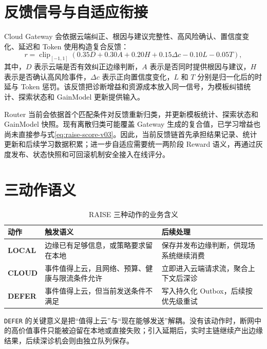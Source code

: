\section{反馈信号与自适应衔接}
Cloud Gateway 会依据云端纠正、根因与建议完整性、高风险确认、置信度变化、延迟和 Token 使用构造复合反馈：
\begin{equation}
  r=\operatorname{clip}_{[-1,1]}\!\left(
  0.35D+0.30A+0.20H+0.15\Delta c-0.10L-0.05T
  \right),
  \label{eq:cloud-reward-v03}
\end{equation}
其中，$D$ 表示云端是否有效纠正边缘判断，$A$ 表示是否同时提供根因与建议，$H$ 表示是否确认高风险事件，$\Delta c$ 表示正向置信度变化，$L$ 和 $T$ 分别是归一化后的时延与 Token 惩罚。该反馈把诊断增益和资源成本放入同一信号，为模板纠错统计、探索状态和 GainModel 更新提供输入。

Router 当前会依据首个匹配条件对反馈重新归类，并更新模板统计、探索状态和 GainModel 快照。现有离散归类可能覆盖 Gateway 生成的复合值，已学习增益也尚未直接参与式\eqref{eq:raise-score-v03}。因此，当前反馈链首先承担结果记录、统计更新和后续学习数据积累；进一步自适应需要统一两阶段 Reward 语义，再通过灰度发布、状态快照和可回滚机制安全接入在线评分。

\section{三动作语义}
\begin{table}[htbp]
  \centering
  \small
  \caption{RAISE 三种动作的业务含义}
  \label{tab:raise-actions}
  \begin{tabularx}{\textwidth}{>{\ttfamily\bfseries}p{} X X}
    \toprule
    \normalfont\bfseries 动作 & \textbf{触发语义} & \textbf{后续处理} \\
    \midrule
    LOCAL & 边缘已有足够信息，或策略要求留在本地 & 保存并发布边缘判断，供现场系统继续消费 \\
    CLOUD & 事件值得上云，且网络、预算、健康与限流条件允许 & 立即进入云端请求流，聚合上下文后深诊 \\
    DEFER & 事件值得上云，但当前发送条件不满足 & 写入持久化 Outbox，后续按优先级重试 \\
    \bottomrule
  \end{tabularx}
\end{table}

\texttt{DEFER} 的关键意义是把“值得上云”与“现在能够发送”解耦。没有该动作时，断网中的高价值事件只能被迫留在本地或直接失败；引入延期后，实时主链继续产出边缘结果，后续深诊机会则由独立队列保存。

